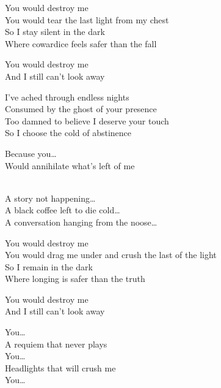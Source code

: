 \begin{lyrics}
You would destroy me\\
You would tear the last light from my chest\\
So I stay silent in the dark\\
Where cowardice feels safer than the fall

You would destroy me\\
And I still can’t look away

I’ve ached through endless nights\\
Consumed by the ghost of your presence\\
Too damned to believe I deserve your touch\\
So I choose the cold of abstinence

Because you…\\
Would annihilate what’s left of me

\\
A story not happening…\\
A black coffee left to die cold…\\
A conversation hanging from the noose…

You would destroy me\\
You would drag me under and crush the last of the light\\
So I remain in the dark\\
Where longing is safer than the truth

You would destroy me\\
And I still can’t look away

You…\\
A requiem that never plays\\
You…\\
Headlights that will crush me\\
You…

\end{lyrics}